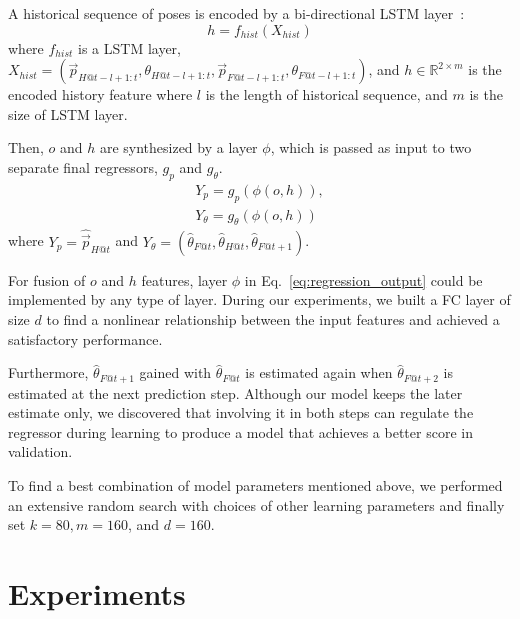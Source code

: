 \documentclass[letterpaper, 10 pt, conference]{ieeeconf}  %
\begin{document}
    A historical sequence of poses is encoded by a bi-directional LSTM
    layer~\cite{Wu16}:
	\begin{equation}
	    h = f_{hist}(X_{hist})
	\end{equation}
    where $f_{hist}$ is a LSTM layer,
	$X_{hist} = (\vec{p}_{H@t-l+1:t}, \theta_{H@t-l+1:t},
	\vec{p}_{F@t-l+1:t}, \theta_{F@t-l+1:t})$,
	and $h \in \mathbb{R}^{2 \times m}$ is the encoded history feature
	where $l$ is the length of historical sequence,
	and $m$ is the size of LSTM layer.

	Then, $o$ and $h$ are synthesized by a layer $\phi$, which is
	passed as input to two separate final regressors, $g_{p}$ and $g_\theta$.
	\begin{equation}
        \begin{split}
        Y_{p} = g_{p}(\phi(o, h)),\\
        Y_{\theta}= g_{\theta}(\phi(o, h))
        \end{split}
        \label{eq:regression_output}
	\end{equation}
	where
	$Y_{p} = \hat{\vec{p}}_{H@t}$ and
	$Y_{\theta} = (\hat{\theta}_{F@t}, \hat{\theta}_{H@t}, \hat{\theta}_{F@t+1})$.

    For fusion of $o$ and $h$ features, layer $\phi$ in
    Eq.~\eqref{eq:regression_output} could be implemented by any type of
    layer. During our experiments, we built a FC layer of size $d$ to
    find a nonlinear relationship between the input features and
    achieved a satisfactory performance.

    Furthermore, $\hat{\theta}_{F@t+1}$ gained with $\hat{\theta}_{F@t}$
    is estimated again when $\hat{\theta}_{F@t+2}$ is estimated at the
    next prediction step. Although our model keeps the later estimate
    only, we discovered that involving it in both steps can regulate the
    regressor during learning to produce a model that achieves a better
    score in validation.

    To find a best combination of model parameters mentioned above, we
    performed an extensive random search with choices of other learning
    parameters and finally set $k=80, m=160$, and $d=160$.

	\section{Experiments}
	\label{sec:experiments}
\end{document}
